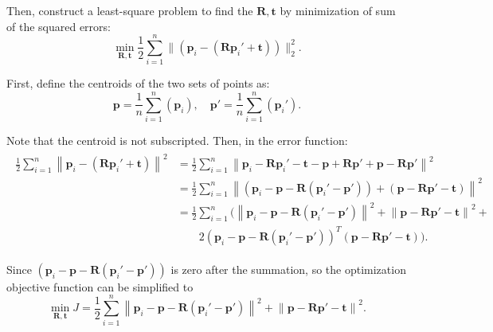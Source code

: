 Then, construct a least-square problem to find the $\mathbf{R}, \mathbf{t}$ by minimization of sum of the squared errors:
\begin{equation}
\mathop {\min }\limits_{\mathbf{R}, \mathbf{t}} \frac{1}{2} \sum\limits_{i = 1}^n\| {\left( {{\mathbf{p}_i} - \left( {\mathbf{R}{\mathbf{p}_i}' + \mathbf{t}} \right)} \right)} \|^2_2.
\end{equation}

First, define the centroids of the two sets of points as:
\begin{equation}
\mathbf{p} = \frac{1}{n}\sum_{i=1}^n ( \mathbf{p}_i ), \quad \mathbf{p}' = \frac{1}{n} \sum_{i=1}^n ( \mathbf{p}_i' ). 
\end{equation}

Note that the centroid is not subscripted. Then, in the error function:
\begin{align*}
\begin{array}{ll}
\frac{1}{2}\sum\limits_{i = 1}^n {{{\left\| {{\mathbf{p}_i} - \left( {\mathbf{R}{ \mathbf{p}_i}' + \mathbf{t}} \right)} \right\|}^2}}  & = \frac{1}{2}\sum\limits_{i = 1}^n {{{\left\| {{\mathbf{p}_i} - \mathbf{R}{\mathbf{p}_i}' - \mathbf{t} - \mathbf{p} + \mathbf{Rp}' + \mathbf{p} - \mathbf{Rp}'} \right\|}^2}} \\
 & = \frac{1}{2}\sum\limits_{i = 1}^n {{{\left\| {\left( {{\mathbf{p}_i} - \mathbf{p} - \mathbf{R}\left( {{\mathbf{p}_i}' - \mathbf{p}'} \right)} \right) + \left( {\mathbf{p} - \mathbf{Rp}' - \mathbf{t}} \right)} \right\|}^2}} \\
& = \frac{1}{2}\sum\limits_{i = 1}^n ( {{\left\| {{\mathbf{p}_i} - \mathbf{p} - \mathbf{R}\left( {{\mathbf{p}_i}' - \mathbf{p}'} \right)} \right\|}^2} + {{\left\| {\mathbf{p} - \mathbf{Rp}' - \mathbf{t}} \right\|}^2} +\\
 & \quad \quad 2{{\left( {{\mathbf{p}_i} - \mathbf{p} - \mathbf{R}\left( {{\mathbf{p}_i}' - \mathbf{p}'} \right)} \right)}^T}\left( {\mathbf{p} - \mathbf{Rp}' - \mathbf{t}} \right)). 
\end{array}
\end{align*}

Since $\left( {{\mathbf{p}_i} - \mathbf{p} - \mathbf{R}\left( {{\mathbf{p}_i}' - \mathbf{p}'} \right)} \right)$ is zero after the summation, so the optimization objective function can be simplified to
\begin{equation}
\mathop {\min }\limits_{\mathbf{R}, \mathbf{t}} J = \frac{1}{2}\sum\limits_{i = 1}^n {{\left\| {{\mathbf{p}_i} - \mathbf{p} - \mathbf{R}\left( {{\mathbf{p}_i}' - \mathbf{p}'} \right)} \right\|}^2} + {{\left\| {\mathbf{p} - \mathbf{Rp}' - \mathbf{t}} \right\|}^2} .
\end{equation}

